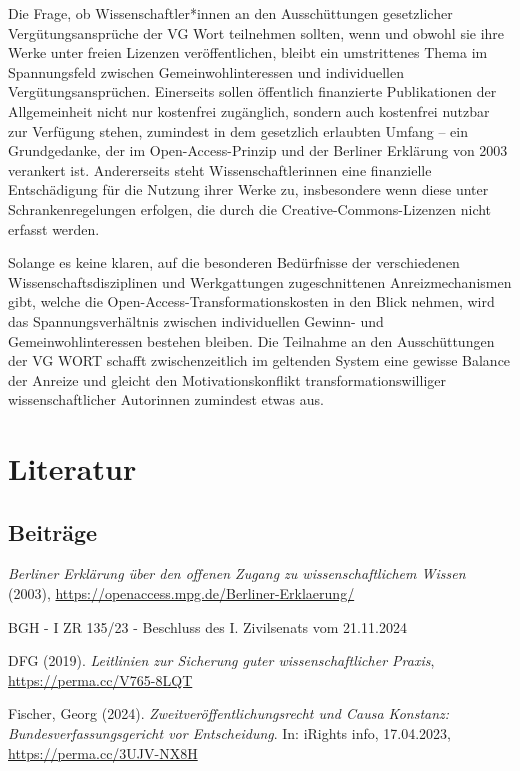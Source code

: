 \documentclass[a4paper,
fontsize=11pt,
oneside,
numbers=noperiodatend,
parskip=half-,
bibliography=totoc,
final
]{scrartcl}
\begin{document}
Die Frage, ob Wissenschaftler*innen an den Ausschüttungen gesetzlicher
Vergütungsansprüche der VG Wort teilnehmen sollten, wenn und obwohl sie
ihre Werke unter freien Lizenzen veröffentlichen, bleibt ein
umstrittenes Thema im Spannungsfeld zwischen Gemeinwohlinteressen und
individuellen Vergütungsansprüchen. Einerseits sollen öffentlich
finanzierte Publikationen der Allgemeinheit nicht nur kostenfrei
zugänglich, sondern auch kostenfrei nutzbar zur Verfügung stehen,
zumindest in dem gesetzlich erlaubten Umfang -- ein Grundgedanke, der im
Open-Access-Prinzip und der Berliner Erklärung von 2003 verankert ist.
Andererseits steht Wissenschaftlerinnen eine finanzielle Entschädigung
für die Nutzung ihrer Werke zu, insbesondere wenn diese unter
Schrankenregelungen erfolgen, die durch die Creative-Commons-Lizenzen
nicht erfasst werden.

Solange es keine klaren, auf die besonderen Bedürfnisse der
verschiedenen Wissenschaftsdisziplinen und Werkgattungen zugeschnittenen
Anreizmechanismen gibt, welche die Open-Access-Transformationskosten in
den Blick nehmen, wird das Spannungsverhältnis zwischen individuellen
Gewinn- und Gemeinwohlinteressen bestehen bleiben. Die Teilnahme an den
Ausschüttungen der VG WORT schafft zwischenzeitlich im geltenden System
eine gewisse Balance der Anreize und gleicht den Motivationskonflikt
transformationswilliger wissenschaftlicher Autorinnen zumindest etwas
aus.

\hypertarget{literatur}{%
\section{Literatur}\label{literatur}}

\hypertarget{beitruxe4ge}{%
\subsection{Beiträge}\label{beitruxe4ge}}

\emph{Berliner Erklärung über den offenen Zugang zu wissenschaftlichem
Wissen} (2003), \url{https://openaccess.mpg.de/Berliner-Erklaerung/}

BGH - I ZR 135/23 - Beschluss des I. Zivilsenats vom 21.11.2024

DFG (2019). \emph{Leitlinien zur Sicherung guter wissenschaftlicher
Praxis}, \url{https://perma.cc/V765-8LQT}

Fischer, Georg (2024). \emph{Zweitveröffentlichungsrecht und Causa
Konstanz: Bundesverfassungsgericht vor Entscheidung}. In: iRights info,
17.04.2023, \url{https://perma.cc/3UJV-NX8H}
\end{document}
